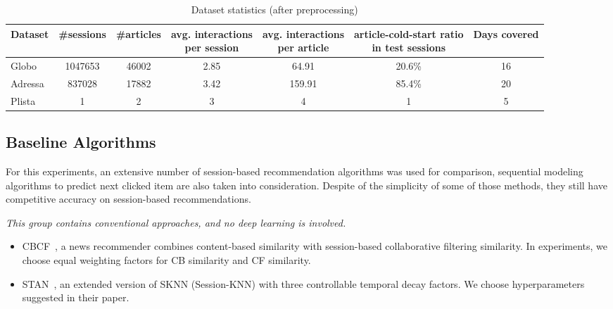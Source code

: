 \begin{table}[th]
  \caption{Dataset statistics (after preprocessing)}
  \label{tb:dataset}
  \centering
  \begin{tabular}{l|cccccc}
    \toprule
     Dataset & \#sessions & \#articles & \tabincell{c}{avg. interactions\\per session}  & \tabincell{c}{avg. interactions\\per article} & \tabincell{c}{article-cold-start ratio\\in test sessions} & Days covered\\
    \midrule
    Globo & 1047653 & 46002 & 2.85 & 64.91 & 20.6\% & 16 \\
    Adressa & 837028 & 17882 & 3.42 & 159.91 & 85.4\% & 20 \\
    Plista & 1 & 2 & 3 & 4 & 1 & 5 \\
    \bottomrule
  \end{tabular}
\end{table}
\subsection{Baseline Algorithms}
For this experiments, an extensive number of session-based recommendation algorithms was used for comparison, sequential modeling algorithms to predict next clicked item are also taken into consideration. Despite of the simplicity of some of those methods, they still have competitive accuracy on session-based recommendations.

\textit{This group contains conventional approaches, and no deep learning is involved.}
\begin{itemize}
  \item CBCF~\cite{sottocornola2018session}, a news recommender combines content-based similarity with session-based collaborative filtering similarity. In experiments, we choose equal weighting factors for CB similarity and CF similarity.
  \item STAN~\cite{garg2019sequence}, an extended version of SKNN (Session-KNN) with three controllable temporal decay factors. We choose hyperparameters suggested in their paper.
\end{itemize}

